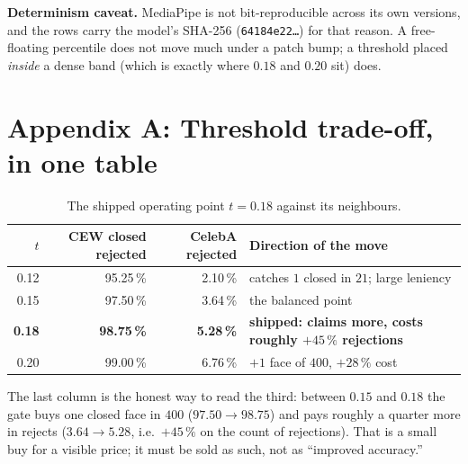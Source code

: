 \documentclass[11pt,a4paper]{article}
\newcommand{\coden}[1]{\texttt{\small #1}}
\begin{document}
\begin{warnbox}
\textbf{Determinism caveat.} MediaPipe is not bit-reproducible across
its own versions, and the rows carry the model's SHA-256
(\coden{64184e22\ldots}) for that reason. A free-floating percentile
does not move much under a patch bump; a threshold placed \emph{inside}
a dense band (which is exactly where $0.18$ and $0.20$ sit) does.
\end{warnbox}

\section*{Appendix A: Threshold trade-off, in one table}

\begin{table}[H]
\centering
\caption{The shipped operating point $t=0.18$ against its neighbours.}
\label{tab:appendix}
\renewcommand{\arraystretch}{1.25}
\begin{tabularx}{\linewidth}{@{}r r r X@{}}
\toprule
$t$ & CEW closed rejected & CelebA rejected & Direction of the move \\
\midrule
0.12 & 95.25\,\% & 2.10\,\%  & catches $1$ closed in $21$; large leniency \\
0.15 & 97.50\,\% & 3.64\,\%  & the balanced point \\
\textbf{0.18} & \textbf{98.75\,\%} & \textbf{5.28\,\%} & \textbf{shipped: claims more, costs roughly $+45\,\%$ rejections} \\
0.20 & 99.00\,\% & 6.76\,\%  & $+1$ face of $400$, $+28\,\%$ cost \\
\bottomrule
\end{tabularx}
\end{table}

\noindent
The last column is the honest way to read the third: between $0.15$ and
$0.18$ the gate buys one closed face in $400$ ($97.50 \to 98.75$) and
pays roughly a quarter more in rejects ($3.64 \to 5.28$, i.e.\
$+45\,\%$ on the count of rejections). That is a small buy for a
visible price; it must be sold as such, not as ``improved accuracy.''
\end{document}
